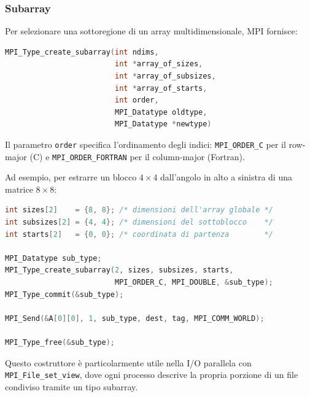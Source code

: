\subsubsection{Subarray}
Per selezionare una sottoregione di un array multidimensionale, MPI fornisce:
\begin{lstlisting}[language=C, numbers=none]
MPI_Type_create_subarray(int ndims,
                         int *array_of_sizes,
                         int *array_of_subsizes,
                         int *array_of_starts,
                         int order,
                         MPI_Datatype oldtype,
                         MPI_Datatype *newtype)
\end{lstlisting}
Il parametro \texttt{order} specifica l'ordinamento degli indici: \texttt{MPI\_ORDER\_C} per il row-major (C) e \texttt{MPI\_ORDER\_FORTRAN} per il column-major (Fortran).

Ad esempio, per estrarre un blocco \(4 \times 4\) dall'angolo in alto a sinistra di una matrice \(8 \times 8\):
\begin{lstlisting}[language=C, numbers=none]
int sizes[2]    = {8, 8}; /* dimensioni dell'array globale */
int subsizes[2] = {4, 4}; /* dimensioni del sottoblocco    */
int starts[2]   = {0, 0}; /* coordinata di partenza        */

MPI_Datatype sub_type;
MPI_Type_create_subarray(2, sizes, subsizes, starts,
                         MPI_ORDER_C, MPI_DOUBLE, &sub_type);
MPI_Type_commit(&sub_type);

MPI_Send(&A[0][0], 1, sub_type, dest, tag, MPI_COMM_WORLD);

MPI_Type_free(&sub_type);
\end{lstlisting}
Questo costruttore è particolarmente utile nella I/O parallela con \texttt{MPI\_File\_set\_view}, dove ogni processo descrive la propria porzione di un file condiviso tramite un tipo subarray.

